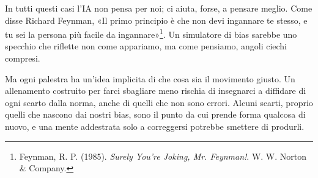 In tutti questi casi l'IA non pensa per noi; ci aiuta, forse, a pensare meglio. Come disse Richard Feynman, «Il primo principio è che non devi ingannare te stesso, e tu sei la persona più facile da ingannare»\footnote{Feynman, R. P. (1985). \textit{Surely You're Joking, Mr. Feynman!}. W. W. Norton \& Company.}. Un simulatore di bias sarebbe uno specchio che riflette non come appariamo, ma come pensiamo, angoli ciechi compresi.

Ma ogni palestra ha un'idea implicita di che cosa sia il movimento giusto. Un allenamento costruito per farci sbagliare meno rischia di insegnarci a diffidare di ogni scarto dalla norma, anche di quelli che non sono errori. Alcuni scarti, proprio quelli che nascono dai nostri bias, sono il punto da cui prende forma qualcosa di nuovo, e una mente addestrata solo a correggersi potrebbe smettere di produrli.
